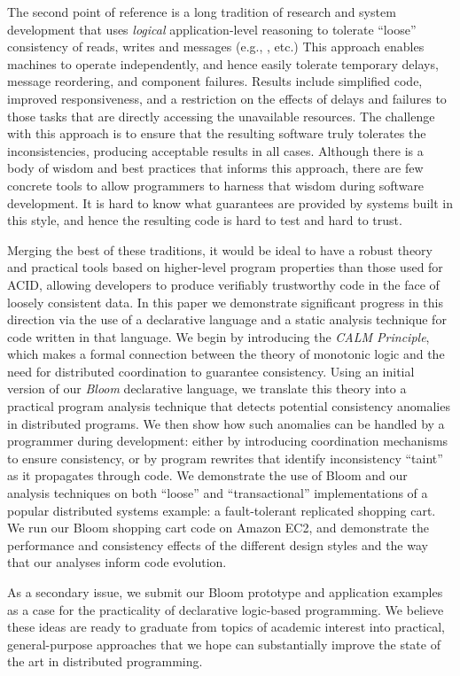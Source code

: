 The second point of reference is a long tradition of research and system development that uses {\em logical} application-level reasoning to tolerate ``loose'' consistency of reads, writes and messages (e.g., \cite{sagas,base,acid20,quicksand}, etc.)  This approach enables machines to operate independently, and hence easily tolerate temporary delays, message reordering, and component failures.  Results include simplified code, improved responsiveness, and a restriction on the effects of delays and failures to those tasks that are directly accessing the unavailable resources.  The challenge with this approach is to ensure that the resulting software truly tolerates the inconsistencies, producing acceptable results in all cases.  Although there is a body of wisdom and best practices that informs this approach, there are few concrete tools to allow programmers to harness that wisdom during software development.  It is hard to know what guarantees are provided by systems built in this style, and hence the resulting code is hard to test and hard to trust.  

Merging the best of these traditions, it would be ideal to have a robust theory and practical tools based on higher-level program properties than those used for ACID, allowing developers to produce verifiably trustworthy code in the face of loosely consistent data.  In this paper we demonstrate significant progress in this direction via the use of a declarative language and a static analysis technique for code written in that language.  We begin by introducing the \emph{CALM Principle}, which makes a formal connection between the theory of monotonic logic and the need for distributed coordination to guarantee consistency.  Using an initial version of our {\em Bloom} declarative language, we translate this theory into a practical program analysis technique that detects potential consistency anomalies in distributed programs.  We then show how such anomalies can be handled by a programmer during development: either by introducing coordination mechanisms to ensure consistency, or by program rewrites that identify inconsistency ``taint'' as it propagates through code.  We demonstrate the use of Bloom and our analysis techniques on both ``loose'' and ``transactional'' implementations of a popular distributed systems example: a fault-tolerant replicated shopping cart.  We run our Bloom shopping cart code on Amazon EC2, and demonstrate the performance and consistency effects of the different design styles and the way that our analyses inform code evolution.

As a secondary issue, we submit our Bloom prototype and application examples as a case for the practicality of declarative logic-based programming.  We believe these ideas are ready to graduate from topics of academic interest into practical, general-purpose approaches that we hope can substantially improve the state of the art in distributed programming.